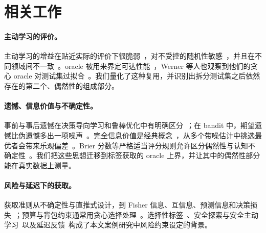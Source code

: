 \documentclass[runningheads]{llncs}
\begin{document}
\section{相关工作}
\label{sec:related}
\paragraph{主动学习的评价。}主动学习的增益在贴近实际的评价下很脆弱~\cite{luth2023navigating}，对不受控的随机性敏感~\cite{ji2023randomness}，并且在不同领域间不一致~\cite{werner2023comparable,werner2024cdalbench}。oracle 被用来界定可达性能~\cite{werner2024cdalbench,huseljic2026boss}，Werner 等人也观察到他们的贪心 oracle 对测试集过拟合~\cite{werner2023comparable}。我们量化了这种复用，并识别出拆分测试集之后依然存在的第二个、偶然性的组成部分。

\paragraph{遗憾、信息价值与不确定性。}事前与事后遗憾在决策导向学习和鲁棒优化中有明确区分~\cite{schutte2023robust}；在 bandit 中，期望遗憾比伪遗憾多出一项噪声~\cite{bubeck2012regret,audibert2010regret}。完全信息价值是经典概念~\cite{howard1966information,raiffa1961applied}，从多个带噪估计中挑选最优者会带来乐观偏差~\cite{smith2006optimizer,cawley2010overfitting}。Brier 分数等严格适当评分规则允许区分偶然性与认知不确定性~\cite{hofman2024quantifying}。我们把这些思想迁移到标签获取的 oracle 上界，并让其中的偶然性部分能在真实数据上测量。

\paragraph{风险与延迟下的获取。}获取准则从不确定性与直推式设计，到 Fisher 信息、互信息、预测信息和决策损失~\cite{cohn1996active,settles2009active,lewis1994sequential,yu2006transductive,ash2021fishing,kirsch2019batchbald,bickfordsmith2023prediction,huang2026loss,chaloner1995bayesian}；预算与背包约束通常用贪心选择处理~\cite{krause2005near,sviridenko2004note,tomanek2010cost}。选择性标签~\cite{lakkaraju2017selective,wei2021selective,kilbertus2020fair,keswani2024partial,crook2004reject}、安全探索与安全主动学习~\cite{sui2015safe,schreiter2015safe,wu2016conservative}以及延迟反馈~\cite{joulani2013delayed,chapelle2014delayed,pham2022latency}构成了本文案例研究中风险约束设定的背景。

\end{document}
